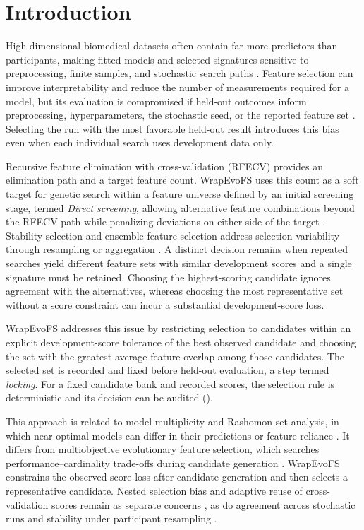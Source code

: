 \FloatBarrier
\section{Introduction}

High-dimensional biomedical datasets often contain far more predictors than participants, making fitted models and selected signatures sensitive to preprocessing, finite samples, and stochastic search paths \citep{ref01,ref02,ref03}. Feature selection can improve interpretability and reduce the number of measurements required for a model, but its evaluation is compromised if held-out outcomes inform preprocessing, hyperparameters, the stochastic seed, or the reported feature set \citep{ref06,ref07,ref08,ref38}. Selecting the run with the most favorable held-out result introduces this bias even when each individual search uses development data only.

Recursive feature elimination with cross-validation (RFECV) provides an elimination path and a target feature count. WrapEvoFS uses this count as a soft target for genetic search within a feature universe defined by an initial screening stage, termed \emph{Direct screening}, allowing alternative feature combinations beyond the RFECV path while penalizing deviations on either side of the target \citep{ref12,ref13,ref15,ref16}. Stability selection and ensemble feature selection address selection variability through resampling or aggregation \citep{ref09,ref40}. A distinct decision remains when repeated searches yield different feature sets with similar development scores and a single signature must be retained. Choosing the highest-scoring candidate ignores agreement with the alternatives, whereas choosing the most representative set without a score constraint can incur a substantial development-score loss.

WrapEvoFS addresses this issue by restricting selection to candidates within an explicit development-score tolerance of the best observed candidate and choosing the set with the greatest average feature overlap among those candidates. The selected set is recorded and fixed before held-out evaluation, a step termed \emph{locking}. For a fixed candidate bank and recorded scores, the selection rule is deterministic and its decision can be audited ().

This approach is related to model multiplicity and Rashomon-set analysis, in which near-optimal models can differ in their predictions or feature reliance \citep{ref47,ref48}. It differs from multiobjective evolutionary feature selection, which searches performance--cardinality trade-offs during candidate generation \citep{ref49}. WrapEvoFS constrains the observed score loss after candidate generation and then selects a representative candidate. Nested selection bias and adaptive reuse of cross-validation scores remain as separate concerns \citep{ref06,ref08,ref39}, as do agreement across stochastic runs and stability under participant resampling \citep{ref36}.

